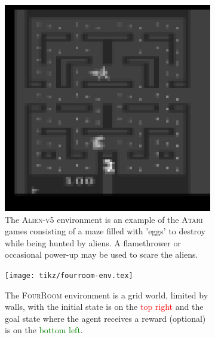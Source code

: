 \documentclass[10pt]{article} %
\begin{document}
\begin{figure}
  \centering
  \begin{subfigure}[b]{0.32\textwidth}
    \centering
    \includegraphics[width=\textwidth]{figures/atari.png}
    \caption{The \textsc{Alien-v5} environment is an example of the \textsc{Atari} games consisting of a maze filled with 'eggs' to destroy while being hunted by aliens. A flamethrower or occasional power-up may be used to scare the aliens.}
    \label{fig:sample-env-atari}
  \end{subfigure}
  \hfill
  \begin{subfigure}[b]{0.32\textwidth}
    \centering
    \texttt{[image: tikz/fourroom-env.tex]}
    \caption{The \textsc{FourRoom} environment is a grid world, limited by walls, with the initial state is on the \textcolor{red}{top right} and the goal state where the agent receives a reward (optional) is on the \textcolor{green}{bottom left}.}
    \label{fig:sample-env-fourroom}
  \end{subfigure}
  \hfill
  \begin{subfigure}[b]{0.32\textwidth}
    \centering

\end{subfigure}
\end{figure}
\end{document}
